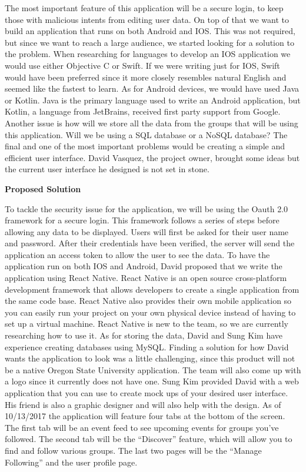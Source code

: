 \documentclass[10pt,letterpaper]{article}
\begin{document}
The most important feature of this application will be a secure login, to keep those with malicious intents from editing user data. On top of that we want to build an application that runs on both Android and IOS. This was not required, but since we want to reach a large audience, we started looking for a solution to the problem. When researching for languages to develop an IOS application we would use either Objective C or Swift. If we were writing just for IOS, Swift would have been preferred since it more closely resembles natural English and seemed like the fastest to learn. As for Android devices, we would have used Java or Kotlin. Java is the primary language used to write an Android application, but Kotlin, a language from JetBrains, received ﬁrst party support from Google. Another issue is how will we store all the data from the groups that will be using this application. Will we be using a SQL database or a NoSQL database? The final and one of the most important problems would be creating a simple and efficient user interface. David Vasquez, the project owner, brought some ideas but the current user interface he designed is not set in stone. \\

\begin{center}
\large
\textbf{Proposed Solution}
\end{center}

To tackle the security issue for the application, we will be using the Oauth 2.0 framework for a secure login. This framework follows a series of steps before allowing any data to be displayed. Users will first be asked for their user name and password. After their credentials have been verified, the server will send the application an access token to allow the user to see the data. To have the application run on both IOS and Android, David proposed that we write the application using React Native. React Native is an open source cross-platform development framework that allows developers to create a single application from the same code base. React Native also provides their own mobile application so you can easily run your project on your own physical device instead of having to set up a virtual machine. React Native is new to the team, so we are currently researching how to use it. As for storing the data, David and Sung Kim have experience creating databases using MySQL. Finding a solution for how David wants the application to look was a little challenging, since this product will not be a native Oregon State University application. The team will also come up with a logo since it currently does not have one. Sung Kim provided David with a web application that you can use to create mock ups of your desired user interface. His friend is also a graphic designer and will also help with the design. As of 10/13/2017 the application will feature four tabs at the bottom of the screen. The first tab will be an event feed to see upcoming events for groups you’ve followed. The second tab will be the “Discover” feature, which will allow you to find and follow various groups. The last two pages will be the “Manage Following” and the user profile page. \\
\end{document}
